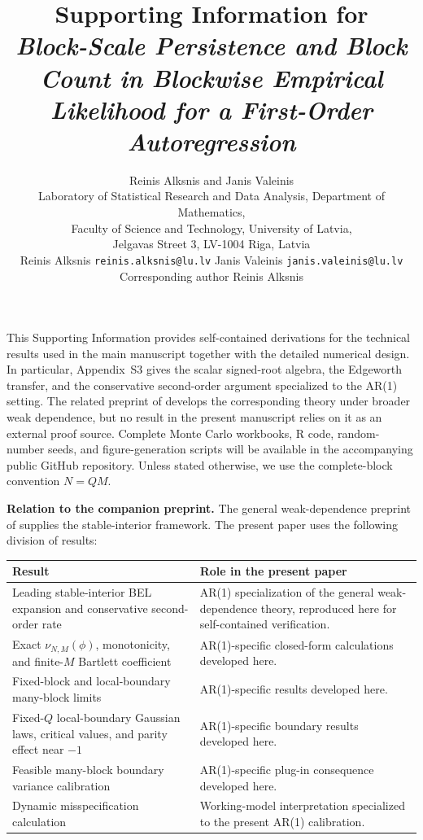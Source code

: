 \documentclass[12pt]{article}
\title{Supporting Information for\\[0.5ex]
\emph{Block-Scale Persistence and Block Count in Blockwise Empirical Likelihood for a First-Order Autoregression}}
\author{Reinis Alksnis and Janis Valeinis\\[0.5ex]
\small Laboratory of Statistical Research and Data Analysis, Department of Mathematics,\\
\small Faculty of Science and Technology, University of Latvia,\\
\small Jelgavas Street 3, LV-1004 Riga, Latvia\\[0.5ex]
\small Reinis Alksnis \texttt{reinis.alksnis@lu.lv} \quad Janis Valeinis \texttt{janis.valeinis@lu.lv}\\[0.5ex]
\small Corresponding author Reinis Alksnis}
\date{}
\theoremstyle{remark}
\begin{document}
\maketitle

\noindent
This Supporting Information provides self-contained derivations for the technical results used in the main manuscript together with the detailed numerical design. In particular, Appendix~S3 gives the scalar signed-root algebra, the Edgeworth transfer, and the conservative second-order argument specialized to the AR(1) setting. The related preprint of \citet{Alksnis.Valeinis:2026} develops the corresponding theory under broader weak dependence, but no result in the present manuscript relies on it as an external proof source. Complete Monte Carlo workbooks, R code, random-number seeds, and figure-generation scripts will be available in the accompanying public GitHub repository. Unless stated otherwise, we use the complete-block convention $N=QM$.

\medskip
\noindent\textbf{Relation to the companion preprint.}
The general weak-dependence preprint of \citet{Alksnis.Valeinis:2026} supplies the stable-interior framework. The present paper uses the following division of results:
\begin{center}
\begin{tabular}{p{}p{}}
\toprule
Result & Role in the present paper \\
\midrule
Leading stable-interior BEL expansion and conservative second-order rate
& AR(1) specialization of the general weak-dependence theory, reproduced here for self-contained verification. \\
Exact $\nu_{N,M}(\phi)$, monotonicity, and finite-$M$ Bartlett coefficient
& AR(1)-specific closed-form calculations developed here. \\
Fixed-block and local-boundary many-block limits
& AR(1)-specific results developed here. \\
Fixed-$Q$ local-boundary Gaussian laws, critical values, and parity effect near $-1$
& AR(1)-specific boundary results developed here. \\
Feasible many-block boundary variance calibration
& AR(1)-specific plug-in consequence developed here. \\
Dynamic misspecification calculation
& Working-model interpretation specialized to the present AR(1) calibration. \\
\bottomrule
\end{tabular}
\end{center}
\end{document}
